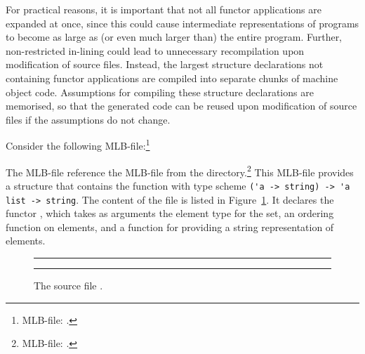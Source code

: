\documentclass[12pt]{book}
\begin{document}
For practical reasons, it is important that not all functor applications are
expanded at once, since this could cause intermediate representations of
programs to become as large as (or even much larger than) the entire
program. Further, non-restricted in-lining could lead to unnecessary
recompilation upon modification of source files.  Instead, the largest structure
declarations not containing functor applications are compiled into separate
chunks of machine object code.  Assumptions for compiling these structure
declarations are memorised, so that the generated code can be reused upon
modification of source files if the assumptions do not change.

Consider the following MLB-file:\footnote{MLB-file: .}
The MLB-file reference the MLB-file  from the 
directory.\footnote{MLB-file: .} This MLB-file
provides a structure  that contains the function 
with type scheme
%
\lstinline!('a -> string) -> 'a list -> string!.
%
The content of the file  is listed in Figure~\ref{Set.fig}. It
declares the functor , which takes as arguments the element type for the
set, an ordering function on elements, and a function for providing a string
representation of elements.
\begin{figure}[ht]
\hrule \medskip
{}
\caption{The source file .}
\medskip \hrule \label{Set.fig}
\end{figure}
\end{document}
